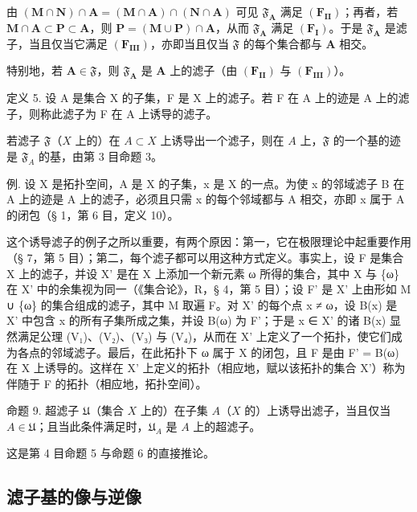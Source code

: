 由 \((\mathbf{M} \cap \mathbf{N}) \cap \mathbf{A} = (\mathbf{M} \cap \mathbf{A}) \cap (\mathbf{N} \cap \mathbf{A})\) 可见 \(\mathfrak{F}_{\mathbf{A}}\) 满足 \((\mathbf{F}_{\mathbf{II}})\)；再者，若 \(\mathbf{M} \cap \mathbf{A} \subset \mathbf{P} \subset \mathbf{A}\)，则 \(\mathbf{P} = (\mathbf{M} \cup \mathbf{P}) \cap \mathbf{A}\)，从而 \(\mathfrak{F}_{\mathbf{A}}\) 满足 \((\mathbf{F}_{\mathbf{I}})\)。于是 \(\mathfrak{F}_{\mathbf{A}}\) 是滤子，当且仅当它满足 \((\mathbf{F}_{\mathbf{III}})\)，亦即当且仅当 \(\mathfrak{F}\) 的每个集合都与 \(\mathbf{A}\) 相交。

特别地，若 \(\mathbf{A} \in \mathfrak{F}\)，则 \(\mathfrak{F}_{\mathbf{A}}\) 是 \(\mathbf{A}\) 上的滤子（由 \((\mathbf{F}_{\mathbf{II}})\) 与 \((\mathbf{F}_{\mathbf{III}})\)）。

定义 5. 设 A 是集合 X 的子集，F 是 X 上的滤子。若 F 在 A 上的迹是 A 上的滤子，则称此滤子为 F 在 A 上诱导的滤子。

若滤子 \(\mathfrak{F}\)（\(X\) 上的）在 \(A \subset X\) 上诱导出一个滤子，则在 \(A\) 上，\(\mathfrak{F}\) 的一个基的迹是 \(\mathfrak{F}_A\) 的基，由第 3 目命题 3。

例. 设 X 是拓扑空间，A 是 X 的子集，x 是 X 的一点。为使 x 的邻域滤子 B 在 A 上的迹是 A 上的滤子，必须且只需 x 的每个邻域都与 A 相交，亦即 x 属于 A 的闭包（§ 1，第 6 目，定义 10）。

这个诱导滤子的例子之所以重要，有两个原因：第一，它在极限理论中起重要作用（§ 7，第 5 目）；第二，每个滤子都可以用这种方式定义。事实上，设 F 是集合 X 上的滤子，并设 X' 是在 X 上添加一个新元素 ω 所得的集合，其中 X 与 \{ω\} 在 X' 中的余集视为同一（《集合论》，R，§ 4，第 5 目）；设 F' 是 X' 上由形如 M ∪ \{ω\} 的集合组成的滤子，其中 M 取遍 F。对 X' 的每个点 x ≠ ω，设 B(x) 是 X' 中包含 x 的所有子集所成之集，并设 B(ω) 为 F'；于是 x ∈ X' 的诸 B(x) 显然满足公理 (V₁)、(V₂)、(V₃) 与 (V₄)，从而在 X' 上定义了一个拓扑，使它们成为各点的邻域滤子。最后，在此拓扑下 ω 属于 X 的闭包，且 F 是由 F' = B(ω) 在 X 上诱导的。这样在 X' 上定义的拓扑（相应地，赋以该拓扑的集合 X'）称为伴随于 F 的拓扑（相应地，拓扑空间）。

命题 9. 超滤子 \(\mathfrak{U}\)（集合 \(X\) 上的）在子集 \(A\)（\(X\) 的）上诱导出滤子，当且仅当 \(A \in \mathfrak{U}\)；且当此条件满足时，\(\mathfrak{U}_A\) 是 \(A\) 上的超滤子。

这是第 4 目命题 5 与命题 6 的直接推论。

\subsection{滤子基的像与逆像}

